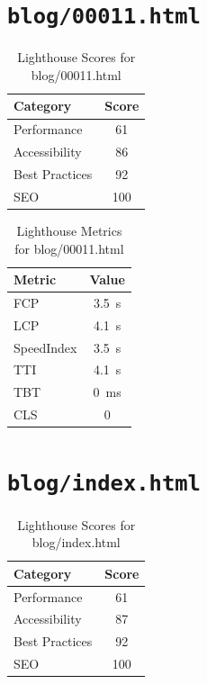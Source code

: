 
\section{\texttt{blog/00011.html}}

    \begin{table}[H]
    \centering
    \caption{Lighthouse Scores for blog/00011.html}
    \begin{tabular}{|l|c|}
    \hline
    Category & Score \\ \hline
    Performance & 61 \\ \hline
    Accessibility & 86 \\ \hline
    Best Practices & 92 \\ \hline
    SEO & 100 \\ \hline
    \end{tabular}
    \end{table}

    \begin{table}[H]
    \centering
    \caption{Lighthouse Metrics for blog/00011.html}
    \begin{tabular}{|l|c|}
    \hline
    Metric & Value \\ \hline
    FCP & 3.5 s \\ \hline
    LCP & 4.1 s \\ \hline
    SpeedIndex & 3.5 s \\ \hline
    TTI & 4.1 s \\ \hline
    TBT & 0 ms \\ \hline
    CLS & 0 \\ \hline
    \end{tabular}
    \end{table}
    \section{\texttt{blog/index.html}}

    \begin{table}[H]
    \centering
    \caption{Lighthouse Scores for blog/index.html}
    \begin{tabular}{|l|c|}
    \hline
    Category & Score \\ \hline
    Performance & 61 \\ \hline
    Accessibility & 87 \\ \hline
    Best Practices & 92 \\ \hline
    SEO & 100 \\ \hline
    \end{tabular}
    \end{table}

